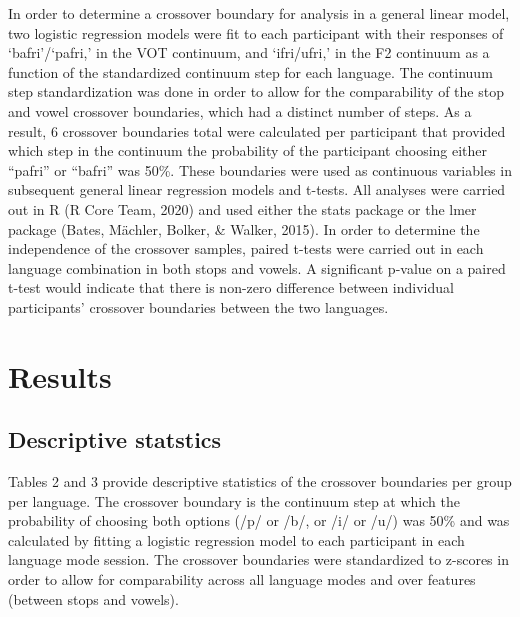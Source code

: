 \documentclass[
  english,
  man]{apa6}
\begin{document}
In order to determine a crossover boundary for analysis in a general linear model, two logistic regression models were fit to each participant with their responses of `bafri'/`pafri,' in the VOT continuum, and `ifri/ufri,' in the F2 continuum as a function of the standardized continuum step for each language.
The continuum step standardization was done in order to allow for the comparability of the stop and vowel crossover boundaries, which had a distinct number of steps.
As a result, 6 crossover boundaries total were calculated per participant that provided which step in the continuum the probability of the participant choosing either ``pafri'' or ``bafri'' was 50\%. These boundaries were used as continuous variables in subsequent general linear regression models and t-tests. All analyses were carried out in R (R Core Team, 2020) and used either the stats package or the lmer package (Bates, Mächler, Bolker, \& Walker, 2015). In order to determine the independence of the crossover samples, paired t-tests were carried out in each language combination in both stops and vowels. A significant p-value on a paired t-test would indicate that there is non-zero difference between individual participants' crossover boundaries between the two languages.

\hypertarget{results}{%
\section{Results}\label{results}}

\hypertarget{descriptive-statstics}{%
\subsection{Descriptive statstics}\label{descriptive-statstics}}

Tables 2 and 3 provide descriptive statistics of the crossover boundaries per group per language. The crossover boundary is the continuum step at which the probability of choosing both options (/p/ or /b/, or /i/ or /u/) was 50\% and was calculated by fitting a logistic regression model to each participant in each language mode session.
The crossover boundaries were standardized to z-scores in order to allow for comparability across all language modes and over features (between stops and vowels).
\end{document}
